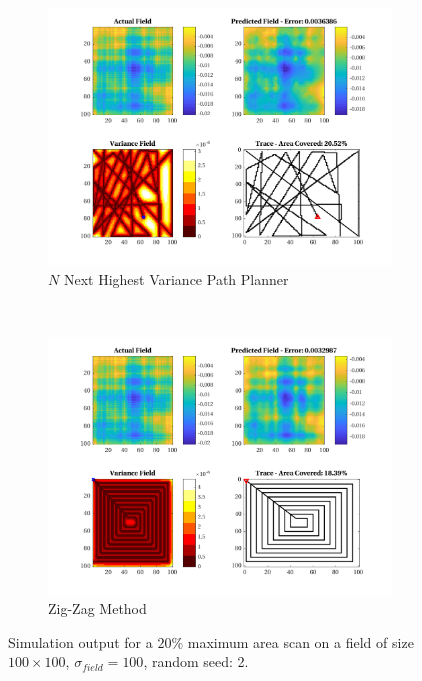 \begin{figure}[htb!]
\begin{subfigure}[t]{0.5\textwidth}
    \end{subfigure}%
    \\
    \begin{subfigure}[t]{0.5\textwidth}
        \centering
        \includegraphics[width=\linewidth]{figures/hbresults/nnhv_20p_100x100_sf_100_seed_2.png}
        \captionsetup{skip=0.10\baselineskip,size=footnotesize}
        \caption{$N$ Next Highest Variance Path Planner}
    \end{subfigure}%
    ~
    \begin{subfigure}[t]{0.5\textwidth}
        \centering
        \includegraphics[width=\linewidth]{figures/hbresults/zz_20p_100x100_sf_100_seed_2.png}
        \captionsetup{skip=0.10\baselineskip,size=footnotesize}
        \caption{Zig-Zag Method}
    \end{subfigure}%
    \captionsetup{skip=0.20\baselineskip}
    \caption{Simulation output for a $20\%$ maximum area scan on a field of size $100 \times 100$, $\sigma_{field} = 100$, random seed: 2.}
    \label{fig:sim_sigma100_p20_s2}
\end{figure}

